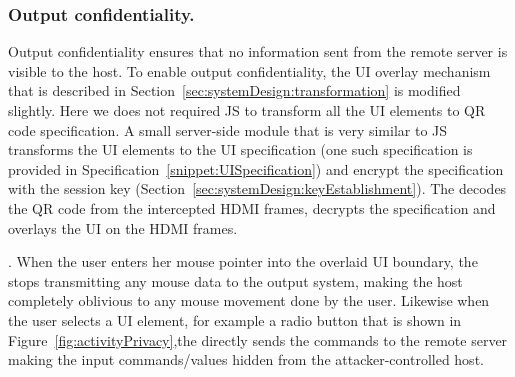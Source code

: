\subsubsection{Output confidentiality.} Output confidentiality ensures that no information sent from the remote server is visible to the host. To enable output confidentiality, the UI overlay mechanism that is described in Section~\ref{sec:systemDesign:transformation} is modified slightly. Here we \name does not required \name JS to transform all the UI elements to QR code specification. A small server-side module that is very similar to \name JS transforms the UI elements to the UI specification (one such specification is provided in Specification~\ref{snippet:UISpecification}) and encrypt the specification with the \tls session key (Section~\ref{sec:systemDesign:keyEstablishment}). The \device decodes the QR code from the intercepted HDMI frames, decrypts the specification and overlays the UI on the HDMI frames.

 . When the user enters her mouse pointer into the overlaid UI boundary, the \device stops transmitting any mouse data to the output system, making the host completely oblivious to any mouse movement done by the user. Likewise when the user selects a UI element, for example a radio button that is shown in Figure~\ref{fig:activityPrivacy},the \device directly sends the commands to the remote server making the input commands/values hidden from the attacker-controlled host.  




